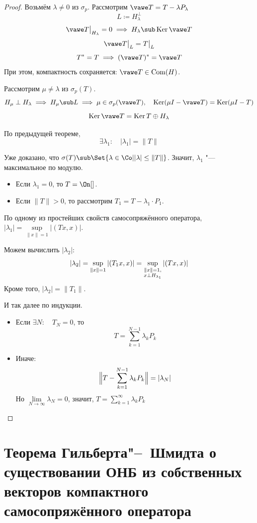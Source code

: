 \begin{proof}
	Возьмём $ \lambda \ne 0 $ из $ \sigma_p $.
	Рассмотрим $ \vawe T = T - \lambda P_\lambda $
	$$ L \coloneq H_\lambda^\perp $$
	$$ \vawe T\bigr|_{H_\lambda} = 0 \implies H_\lambda \sub \operatorname{Ker} \vawe T $$
	$$ \vawe T \bigr|_L = T \bigl|_L $$
	$$ T^* = T \implies (\vawe T)^* = \vawe T $$
	При этом, компактность сохраняется: $ \vawe T \in \mathrm{Com}(H) $.

	Рассмотрим $ \mu \ne \lambda $ из $ \sigma_p(T) $.
	$$ H_\mu \perp H_\lambda \implies H_\mu \sub L \implies \mu \in \sigma_p(\vawe T),
	\quad \operatorname{Ker}(\mu I - \vawe T) = \operatorname{Ker}(\mu I - T) $$
	$$ \operatorname{Ker} \vawe T = \operatorname{Ker} T \oplus H_\lambda $$

	По предыдущей теореме,
	$$ \exists \lambda_1 : \quad |\lambda_1| = \|T\| $$

	Уже доказано, что $ \sigma(T) \sub \Set{\lambda \in \Co | {} |\lambda| \le \|T\|} $.
	Значит, $ \lambda_1 $ "--- максимальное по модулю.
	\begin{itemize}
		\item Если $ \lambda_1 = 0 $, то $ T = \On[] $.
		\item Если $ \|T\| > 0 $, то рассмотрим $ T_1 = T - \lambda_1 \cdot P_1 $.
	\end{itemize}

	По одному из простейших свойств самосопряжённого оператора,
	$ |\lambda_1| = \sup\limits_{\|x\| = 1}|(Tx, x)| $.

	Можем вычислить $ |\lambda_2| $:
	$$ |\lambda_2| = \sup\limits_{\|x\| = 1}|(T_1x, x)| =
	\sup\limits_{\begin{subarray}{c}
		\|x\| = 1, \\
		x \perp H_{\lambda_1}
	\end{subarray}}|(Tx, x)| $$
	Кроме того, $ |\lambda_2| = \|T_1\| $.

	И так далее по индукции.
	\begin{itemize}
		\item Если $ \exists N : \quad T_N = 0 $, то
			$$ T = \sum_{k = 1}^{N - 1}\lambda_k P_k $$
		\item Иначе:
			$$ \Bigl\| T - \sum_{k = 1}^{N - 1} \lambda_kP_k \Bigr\| = |\lambda_N| $$
			Но $ \lim\limits_{N \to \infty}\lambda_N = 0 $, значит,
			$ T = \sum_{k = 1}^\infty \lambda_k P_k $
	\end{itemize}
\end{proof}

\section{Теорема Гильберта\texorpdfstring{"--~}{--}Шмидта о существовании ОНБ из собственных
векторов компактного самосопряжённого оператора}

